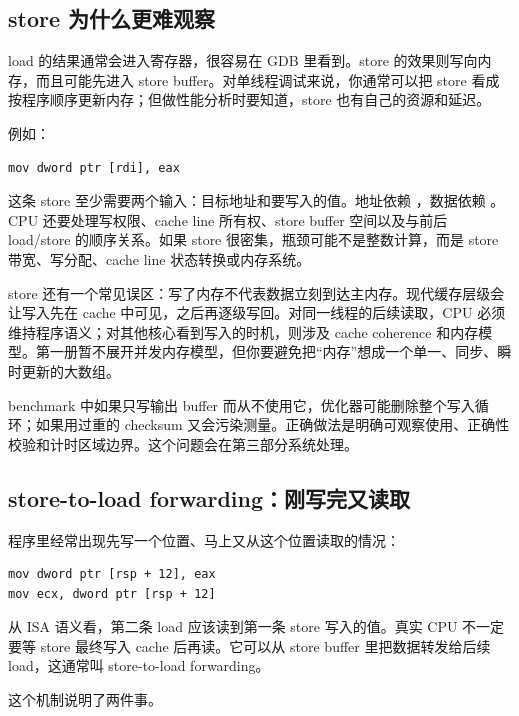 \subsection{store 为什么更难观察}

load 的结果通常会进入寄存器，很容易在 GDB 里看到。store 的效果则写向内存，而且可能先进入 store buffer。对单线程调试来说，你通常可以把 store 看成按程序顺序更新内存；但做性能分析时要知道，store 也有自己的资源和延迟。

例如：

\begin{lstlisting}
mov dword ptr [rdi], eax
\end{lstlisting}

这条 store 至少需要两个输入：目标地址和要写入的值。地址依赖 ，数据依赖 。CPU 还要处理写权限、cache line 所有权、store buffer 空间以及与前后 load/store 的顺序关系。如果 store 很密集，瓶颈可能不是整数计算，而是 store 带宽、写分配、cache line 状态转换或内存系统。

store 还有一个常见误区：写了内存不代表数据立刻到达主内存。现代缓存层级会让写入先在 cache 中可见，之后再逐级写回。对同一线程的后续读取，CPU 必须维持程序语义；对其他核心看到写入的时机，则涉及 cache coherence 和内存模型。第一册暂不展开并发内存模型，但你要避免把“内存”想成一个单一、同步、瞬时更新的大数组。

\begin{warningbox}
benchmark 中如果只写输出 buffer 而从不使用它，优化器可能删除整个写入循环；如果用过重的 checksum 又会污染测量。正确做法是明确可观察使用、正确性校验和计时区域边界。这个问题会在第三部分系统处理。
\end{warningbox}

\subsection{store-to-load forwarding：刚写完又读取}

程序里经常出现先写一个位置、马上又从这个位置读取的情况：

\begin{lstlisting}
mov dword ptr [rsp + 12], eax
mov ecx, dword ptr [rsp + 12]
\end{lstlisting}

从 ISA 语义看，第二条 load 应该读到第一条 store 写入的值。真实 CPU 不一定要等 store 最终写入 cache 后再读。它可以从 store buffer 里把数据转发给后续 load，这通常叫 store-to-load forwarding。

这个机制说明了两件事。

